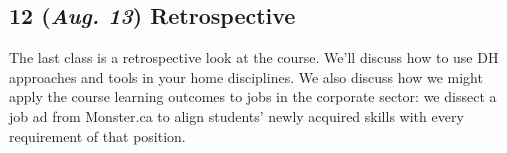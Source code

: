 \documentclass[11pt]{article}
\begin{document}
\subsection*{12 (\textit{Aug. 13}) Retrospective}
\label{sec:org5112581}
The last class is a retrospective look at the course. We'll discuss how to use DH approaches and tools in your home disciplines. We also discuss how we might apply the course learning outcomes to jobs in the corporate sector: we dissect a job ad from Monster.ca to align students' newly acquired skills with every requirement of that position.
\end{document}
